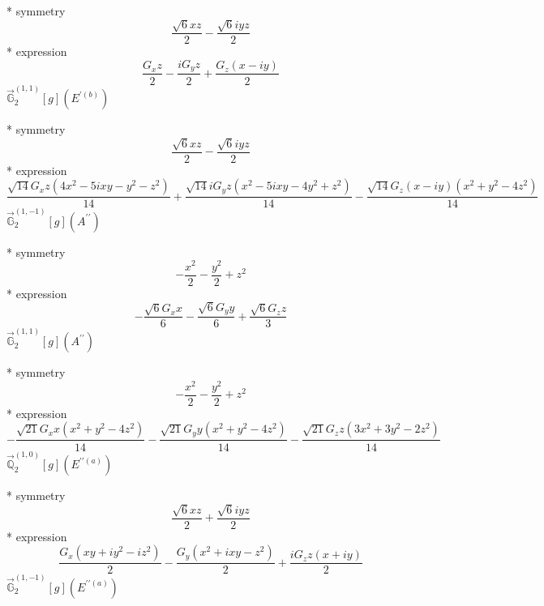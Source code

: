 \documentclass[fleqn,8pt]{jsarticle}
\begin{document}
\noindent\quad ** symmetry
\begin{dmath*}
\frac{\sqrt{6} x z}{2} - \frac{\sqrt{6} i y z}{2}
\end{dmath*}
\noindent\quad ** expression
\begin{dmath*}
\frac{G_{x} z}{2} - \frac{i G_{y} z}{2} + \frac{G_{z} \left(x - i y\right)}{2}
\end{dmath*}
\noindent\quad $\vec{\mathbb{G}}_{2}^{(1,1)}[g](E^{\prime(b)})$

\noindent\quad ** symmetry
\begin{dmath*}
\frac{\sqrt{6} x z}{2} - \frac{\sqrt{6} i y z}{2}
\end{dmath*}
\noindent\quad ** expression
\begin{dmath*}
\frac{\sqrt{14} G_{x} z \left(4 x^{2} - 5 i x y - y^{2} - z^{2}\right)}{14} + \frac{\sqrt{14} i G_{y} z \left(x^{2} - 5 i x y - 4 y^{2} + z^{2}\right)}{14} - \frac{\sqrt{14} G_{z} \left(x - i y\right) \left(x^{2} + y^{2} - 4 z^{2}\right)}{14}
\end{dmath*}
\noindent\quad $\vec{\mathbb{G}}_{2}^{(1,-1)}[g](A^{\prime\prime})$

\noindent\quad ** symmetry
\begin{dmath*}
- \frac{x^{2}}{2} - \frac{y^{2}}{2} + z^{2}
\end{dmath*}
\noindent\quad ** expression
\begin{dmath*}
- \frac{\sqrt{6} G_{x} x}{6} - \frac{\sqrt{6} G_{y} y}{6} + \frac{\sqrt{6} G_{z} z}{3}
\end{dmath*}
\noindent\quad $\vec{\mathbb{G}}_{2}^{(1,1)}[g](A^{\prime\prime})$

\noindent\quad ** symmetry
\begin{dmath*}
- \frac{x^{2}}{2} - \frac{y^{2}}{2} + z^{2}
\end{dmath*}
\noindent\quad ** expression
\begin{dmath*}
- \frac{\sqrt{21} G_{x} x \left(x^{2} + y^{2} - 4 z^{2}\right)}{14} - \frac{\sqrt{21} G_{y} y \left(x^{2} + y^{2} - 4 z^{2}\right)}{14} - \frac{\sqrt{21} G_{z} z \left(3 x^{2} + 3 y^{2} - 2 z^{2}\right)}{14}
\end{dmath*}
\noindent\quad $\vec{\mathbb{Q}}_{2}^{(1,0)}[g](E^{\prime\prime(a)})$

\noindent\quad ** symmetry
\begin{dmath*}
\frac{\sqrt{6} x z}{2} + \frac{\sqrt{6} i y z}{2}
\end{dmath*}
\noindent\quad ** expression
\begin{dmath*}
\frac{G_{x} \left(x y + i y^{2} - i z^{2}\right)}{2} - \frac{G_{y} \left(x^{2} + i x y - z^{2}\right)}{2} + \frac{i G_{z} z \left(x + i y\right)}{2}
\end{dmath*}
\noindent\quad $\vec{\mathbb{G}}_{2}^{(1,-1)}[g](E^{\prime\prime(a)})$
\end{document}
